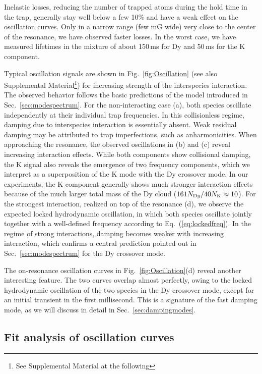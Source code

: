 Inelastic losses, reducing the number of trapped atoms during the hold time in the trap, generally stay well below a few 10\% and have a weak effect on the oscillation curves. Only in a narrow range (few mG wide) very close to the center of the resonance, we have observed faster losses. In the worst case, we have measured lifetimes in the mixture of about 150\,ms for Dy and 50\,ms for the K component. 

Typical oscillation signals are shown in Fig.~\ref{fig:Oscillation} (see also Supplemental Material\footnote{See Supplemental Material at the following }) for increasing strength of the interspecies interaction. The observed behavior follows the basic predictions of the model introduced in Sec.~\ref{sec:modespectrum}. For the non-interacting case (a), both species oscillate independently at their individual trap frequencies. In this collisionless regime, damping due to interspecies interaction is essentially absent. Weak residual damping may be attributed to trap imperfections, such as anharmonicities.
When approaching the resonance, the observed oscillations in (b) and (c) reveal increasing interaction effects. While both components show collisional damping, the K signal also reveals the emergence of two frequency components, which we interpret as a superposition of the K mode with the Dy crossover mode. In our experiments, the K component generally shows much stronger interaction effects because of the much larger total mass of the Dy cloud ($161 N_{\textrm Dy}/40 N_{\textrm K}\approx 10$). For the strongest interaction, realized on top of the resonance (d), we observe the expected locked hydrodynamic oscillation, in which both species oscillate jointly together with a well-defined frequency according to Eq.~(\ref{eq:lockedfreq}). In the regime of strong interactions, damping becomes weaker with increasing interaction, which confirms a central prediction pointed out in Sec.~\ref{sec:modespectrum} for the Dy crossover mode. 

The on-resonance oscillation curves in Fig.~\ref{fig:Oscillation}(d) reveal another interesting feature. The two curves overlap almost perfectly, owing to the locked hydrodynamic oscillation of the two species in the Dy crossover mode, except for an initial transient in the first millisecond. This is a signature of the fast damping mode, as we will discuss in detail in Sec.~\ref{sec:dampingmodes}. 


\subsection{Fit analysis of oscillation curves}\label{ssec:fitting}

